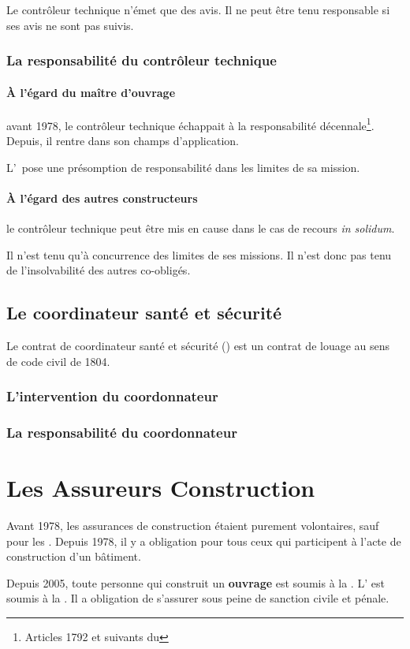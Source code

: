 					Le contrôleur technique n'émet que des avis. Il ne peut être tenu responsable si ses avis ne sont pas suivis.
			
			\subsubsection{La responsabilité du contrôleur technique}
			
				\paragraph{À l'égard du maître d'ouvrage}
				
					avant 1978, le contrôleur technique échappait à la responsabilité décennale\footnote{Articles 1792 et suivants du \cciv*}. Depuis, il rentre dans son champs d'application.
					
					L'\  pose une présomption de responsabilité dans les limites de sa mission.
				
				\paragraph{À l'égard des autres constructeurs}
				
					le contrôleur technique peut être mis en cause dans le cas de recours \emph{in solidum}.
					
					Il n'est tenu qu'à concurrence des limites de ses missions. Il n'est donc pas tenu de l'insolvabilité des autres co-obligés.
		
		\subsection{Le coordinateur santé et sécurité}
		
			Le contrat de coordinateur santé et sécurité (\CSPS) est un contrat de louage au sens de code civil de 1804.
		
			\subsubsection{L'intervention du coordonnateur}
			
			\subsubsection{La responsabilité du coordonnateur}
	
	\section{Les Assureurs Construction}
	
		Avant 1978, les assurances de construction étaient purement volontaires, sauf pour les \archi{}. Depuis 1978, il y a obligation pour tous ceux qui participent à l'acte de construction d'un bâtiment.
		
		Depuis 2005, toute personne qui construit un \textbf{ouvrage} est soumis à la \do{}. L'\E{} est soumis à la \rcd{}. Il a obligation de s'assurer sous peine de sanction civile et pénale.